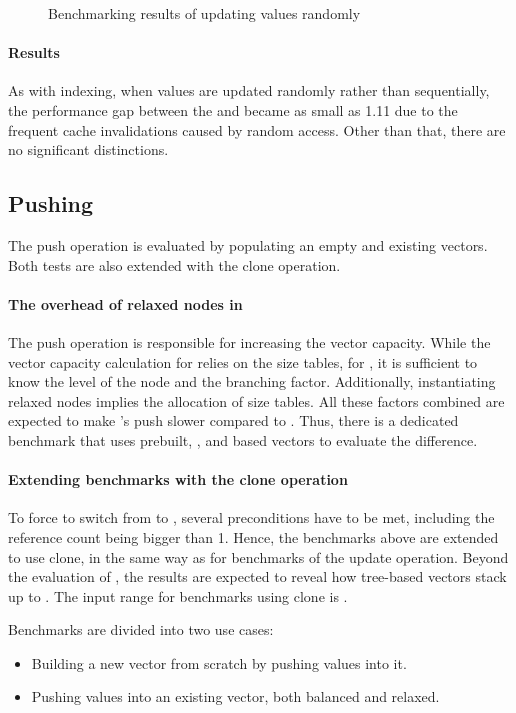 \begin{figure}[!htbp]
    \caption{Benchmarking results of updating values randomly}
    \label{fig:update-randomly}
\end{figure}

\paragraph{Results}
As with indexing, when values are updated randomly rather than sequentially, the performance gap between the \stdvec{} and \pvec{} became as small as 1.11 due to the frequent cache invalidations caused by random access. Other than that, there are no significant distinctions.

\subsection{Pushing}
The push operation is evaluated by populating an empty and existing vectors. Both tests are also extended with the clone operation.

\paragraph{The overhead of relaxed nodes in \rrbtree{}}
The push operation is responsible for increasing the vector capacity. While the vector capacity calculation for \rrbtree{} relies on the size tables, for \rbtree{}, it is sufficient to know the level of the node and the branching factor. Additionally, instantiating relaxed nodes implies the allocation of size tables. All these factors combined are expected to make \rrbtree{}'s push slower compared to \rbtree{}. Thus, there is a dedicated benchmark that uses prebuilt, \rrbtree{}, and \rbtree{} based vectors to evaluate the difference.

\paragraph{Extending benchmarks with the clone operation}
To force \pvec{} to switch from \stdvec{} to \rrbvec{}, several preconditions have to be met, including the reference count being bigger than 1. Hence, the benchmarks above are extended to use clone, in the same way as for benchmarks of the update operation. Beyond the evaluation of \pvec{}, the results are expected to reveal how tree-based vectors stack up to \stdvec{}. The input range for benchmarks using clone is \range{[20, \kilo{40}]}.

Benchmarks are divided into two use cases:
\begin{itemize}
    \item Building a new vector from scratch by pushing values into it.
    \item Pushing values into an existing vector, both balanced and relaxed.
\end{itemize}

